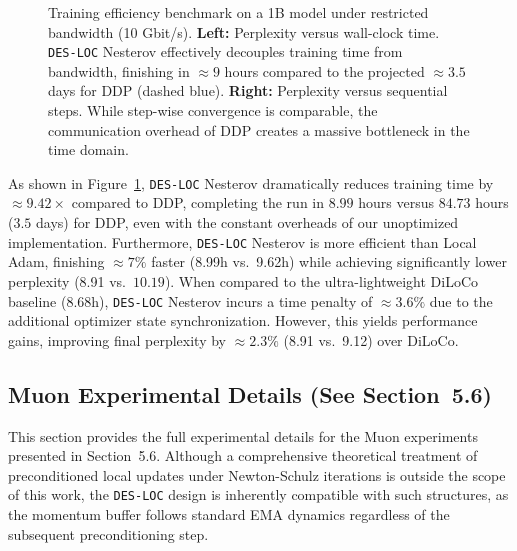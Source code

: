 \begin{figure}[t]
\centering
\caption{Training efficiency benchmark on a 1B model under restricted bandwidth (10 Gbit/s). \textbf{Left:} Perplexity versus wall-clock time. \texttt{DES-LOC} Nesterov effectively decouples training time from bandwidth, finishing in $\approx 9$ hours compared to the projected $\approx 3.5$ days for DDP (dashed blue). \textbf{Right:} Perplexity versus sequential steps. While step-wise convergence is comparable, the communication overhead of DDP creates a massive bottleneck in the time domain.}
\label{fig:low_bandwidth}
\end{figure}

As shown in Figure~\ref{fig:low_bandwidth}, \texttt{DES-LOC} Nesterov dramatically reduces training time by $\approx 9.42\times$ compared to DDP, completing the run in $8.99$ hours versus $84.73$ hours ($3.5$ days) for DDP, even with the constant overheads of our unoptimized implementation. Furthermore, \texttt{DES-LOC} Nesterov is more efficient than Local Adam, finishing $\approx 7\%$ faster (8.99h vs.\ 9.62h) while achieving significantly lower perplexity (8.91 vs.\ $10.19$). When compared to the ultra-lightweight DiLoCo baseline (8.68h), \texttt{DES-LOC} Nesterov incurs a time penalty of $\approx 3.6\%$ due to the additional optimizer state synchronization. However, this yields performance gains, improving final perplexity by $\approx 2.3\%$ (8.91 vs.\ 9.12) over DiLoCo.

\begin{center}\end{center}

\subsection{Muon Experimental Details (See Section~5.6)}
\label{sec:b7_muon_details}

This section provides the full experimental details for the Muon experiments presented in Section~5.6. Although a comprehensive theoretical treatment of preconditioned local updates under Newton-Schulz iterations is outside the scope of this work, the \texttt{DES-LOC} design is inherently compatible with such structures, as the momentum buffer follows standard EMA dynamics regardless of the subsequent preconditioning step.

